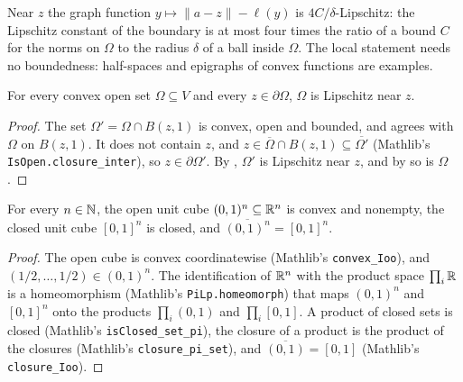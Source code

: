 Near $z$ the graph function $y \mapsto \|a - z\| - \ell(y)$ is $4C/\delta$-Lipschitz: the
Lipschitz constant of the boundary is at most four times the ratio of a bound $C$ for the norms on
$\Omega$ to the radius $\delta$ of a ball inside $\Omega$. The local statement needs no
boundedness: half-spaces and epigraphs of convex functions are examples.

\begin{corollary}
\label{cor:open-convex-lipschitz-near-point}
\leanok
{}
For every convex open set $\Omega \subseteq V$ and every $z \in \partial\Omega$, $\Omega$ is
Lipschitz near $z$.
\end{corollary}

\begin{proof}
\leanok
The set $\Omega' = \Omega \cap B(z, 1)$ is convex, open and bounded, and agrees with $\Omega$ on
$B(z, 1)$. It does not contain $z$, and $z \in \overline{\Omega} \cap B(z, 1) \subseteq
\overline{\Omega'}$ (Mathlib's \texttt{IsOpen.\allowbreak closure\_\allowbreak inter}), so
$z \in \partial\Omega'$. By , $\Omega'$ is Lipschitz near $z$, and by
 so is $\Omega$.
\end{proof}

\begin{lemma}
\label{lem:unit-cube}
\leanok
For every $n \in \mathbb{N}$, the open unit cube $(0, 1)^n \subseteq \mathbb{R}^n$ is convex and nonempty, the
closed unit cube $[0, 1]^n$ is closed, and $\overline{(0, 1)^n} = [0, 1]^n$.
\end{lemma}

\begin{proof}
\leanok
The open cube is convex coordinatewise (Mathlib's \texttt{convex\_\allowbreak Ioo}), and
$(1/2, \dots, 1/2) \in (0, 1)^n$. The identification of $\mathbb{R}^n$ with the product space
$\prod_{i} \mathbb{R}$ is a homeomorphism (Mathlib's \texttt{PiLp.\allowbreak homeomorph}) that maps
$(0, 1)^n$ and $[0, 1]^n$ onto the products $\prod_i (0, 1)$ and $\prod_i [0, 1]$. A product of
closed sets is closed (Mathlib's \texttt{isClosed\_\allowbreak set\_\allowbreak pi}), the closure
of a product is the product of the closures (Mathlib's
\texttt{closure\_\allowbreak pi\_\allowbreak set}), and $\overline{(0, 1)} = [0, 1]$ (Mathlib's
\texttt{closure\_\allowbreak Ioo}).
\end{proof}

